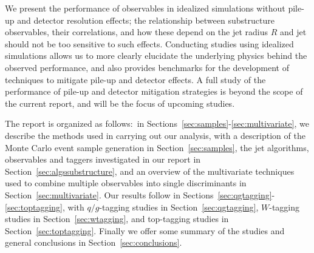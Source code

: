 
We present the performance of observables in idealized simulations without pile-up and detector resolution effects;
the relationship between substructure observables, their correlations, and how these depend on the jet radius $R$ and jet \pt should not be too sensitive to such effects. Conducting  studies using idealized simulations allows us to more clearly elucidate the underlying physics behind the observed performance, and also provides benchmarks for the development of techniques to mitigate pile-up and detector effects. A full study of the performance of pile-up and detector mitigation strategies is beyond the scope of the current report, and will be the focus of upcoming studies.

The report is organized as follows:~in Sections~\ref{sec:samples}-\ref{sec:multivariate}, we describe the methods used in carrying out our analysis, with a description of the Monte Carlo event sample generation in Section~\ref{sec:samples}, the jet algorithms, observables and taggers investigated in our report in Section~\ref{sec:algssubstructure}, and an overview of the multivariate techniques used to combine multiple observables into single discriminants in Section~\ref{sec:multivariate}. Our results follow in Sections~\ref{sec:qgtagging}-\ref{sec:toptagging}, with $q/g$-tagging studies in Section~\ref{sec:qgtagging}, $W$-tagging studies in Section~\ref{sec:wtagging}, and top-tagging studies in Section~\ref{sec:toptagging}. Finally we offer some summary of the studies and general conclusions in Section~\ref{sec:conclusions}.\\


